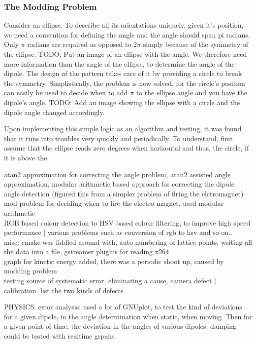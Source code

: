 		\subsubsection{The Modding Problem}
			Consider an ellipse. To describe all its orientations uniquely, given it's position, we need a convention for defining the angle and the angle should span pi radians. Only $\pi$ radians are required as opposed to $2\pi$ simply because of the symmetry of the ellipse. TODO: Put an image of an ellipse with the angle. We therefore need more information than the angle of the ellipse, to determine the angle of the dipole. The design of the pattern takes care of it by providing a circle to break the symmetry. Simplistically, the problem is now solved, for the circle's position can easily be used to decide when to add $\pi$ to the ellipse angle and you have the dipole's angle. TODO: Add an image showing the ellipse with a circle and the dipole angle changed accordingly.
			\par
			Upon implementing this simple logic as an algorithm and testing, it was found that it runs into troubles very quickly and periodically. To understand, first assume that the ellipse reads zero degrees when horizontal and thus, the circle, if it is above the 
			\par
			atan2 approximation for correcting the angle problem, atan2 assisted angle approximation, modular arithmetic based approach for correcting the dipole angle detection (figured this from a simpler problem of firing the elctromagnet)
		\\
		mod problem for deciding when to fire the electro magnet, used modular arithmetic
		\\
		RGB based colour detection to HSV based colour filtering, to improve high speed performance | various problems such as conversion of rgb to hsv and so on..
		\\
		misc: cmake was fiddled around with, auto numbering of lattice points, writing all the data into a file, gstreamer plugins for reading x264
		\\
		graph for kinetic energy added, there was a periodic shoot up, caused by modding problem
		\\
		testing source of systematic error, eliminating a cause, camera defect | calibration. list the two kinds of defects
		\par				
		PHYSICS:
		error analysis: used a lot of GNUplot, to test the kind of deviations for a given dipole, in the angle determination when static, when moving. Then for a given point of time, the deviation in the angles of various dipoles. damping could be tested with realtime grpahs

